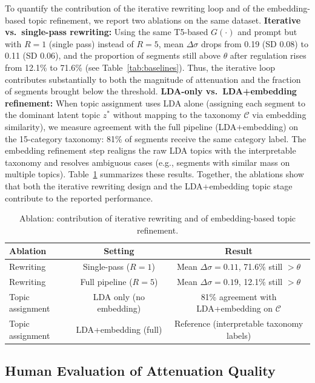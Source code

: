 \documentclass[final,1p,times]{elsarticle}
\begin{document}
To quantify the contribution of the iterative rewriting loop and of the embedding-based topic refinement, we report two ablations on the same dataset. \textbf{Iterative vs.\ single-pass rewriting:} Using the same T5-based $G(\cdot)$ and prompt but with $R=1$ (single pass) instead of $R=5$, mean $\Delta\sigma$ drops from 0.19 (SD 0.08) to 0.11 (SD 0.06), and the proportion of segments still above $\theta$ after regulation rises from 12.1\% to 71.6\% (see Table~\ref{tab:baselines}). Thus, the iterative loop contributes substantially to both the magnitude of attenuation and the fraction of segments brought below the threshold. \textbf{LDA-only vs.\ LDA+embedding refinement:} When topic assignment uses LDA alone (assigning each segment to the dominant latent topic $z^*$ without mapping to the taxonomy $\mathcal{C}$ via embedding similarity), we measure agreement with the full pipeline (LDA+embedding) on the 15-category taxonomy: 81\% of segments receive the same category label. The embedding refinement step realigns the raw LDA topics with the interpretable taxonomy and resolves ambiguous cases (e.g., segments with similar mass on multiple topics). Table~\ref{tab:ablation} summarizes these results. Together, the ablations show that both the iterative rewriting design and the LDA+embedding topic stage contribute to the reported performance.

\begin{table}[H]
\centering
\caption{Ablation: contribution of iterative rewriting and of embedding-based topic refinement.}
\label{tab:ablation}
\small
\begin{tabular}{lcc}
\toprule
Ablation & Setting & Result \\
\midrule
Rewriting & Single-pass ($R{=}1$) & Mean $\Delta\sigma = 0.11$, 71.6\% still $> \theta$ \\
Rewriting & Full pipeline ($R{=}5$) & Mean $\Delta\sigma = 0.19$, 12.1\% still $> \theta$ \\
Topic assignment & LDA only (no embedding) & 81\% agreement with LDA+embedding on $\mathcal{C}$ \\
Topic assignment & LDA+embedding (full) & Reference (interpretable taxonomy labels) \\
\bottomrule
\end{tabular}
\end{table}

\subsection{Human Evaluation of Attenuation Quality}
\end{document}
